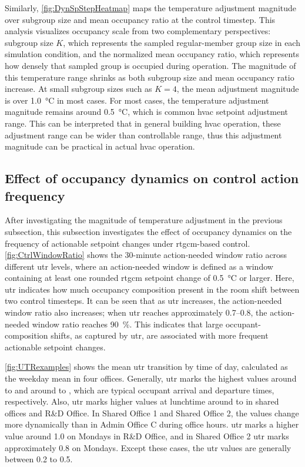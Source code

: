 Similarly, \autoref{fig:DynSpStepHeatmap} maps the temperature adjustment magnitude over subgroup size and mean occupancy ratio at the control timestep.
This analysis visualizes occupancy scale from two complementary perspectives: subgroup size $K$, which represents the sampled regular-member group size in each simulation condition, and the normalized mean occupancy ratio, which represents how densely that sampled group is occupied during operation.
The magnitude of this temperature range shrinks as both subgroup size and mean occupancy ratio increase.
At small subgroup sizes such as $K=4$, the mean adjustment magnitude is over \qty{1.0}{\celsius} in most cases.
For most cases, the temperature adjustment magnitude remains around \qty{0.5}{\celsius}, which is common \ac{hvac} setpoint adjustment range.
This can be interpreted that in general building \ac{hvac} operation, these adjustment range can be wider than controllable range, thus this adjustment magnitude can be practical in actual \ac{hvac} operation.

\subsection{Effect of occupancy dynamics on control action frequency}
After investigating the magnitude of temperature adjustment in the previous subsection, this subsection investigates the effect of occupancy dynamics on the frequency of actionable setpoint changes under \ac{rtgcm}-based control.
\autoref{fig:CtrlWindowRatio} shows the 30-minute action-needed window ratio across different \ac{utr} levels, where an action-needed window is defined as a window containing at least one rounded \ac{rtgcm} setpoint change of \qty{0.5}{\celsius} or larger.
Here, \ac{utr} indicates how much occupancy composition present in the room shift between two control timesteps.
It can be seen that as \ac{utr} increases, the action-needed window ratio also increases; when \ac{utr} reaches approximately 0.7--0.8, the action-needed window ratio reaches \qty{90}{\percent}.
This indicates that large occupant-composition shifts, as captured by \ac{utr}, are associated with more frequent actionable setpoint changes.

\autoref{fig:UTRexamples} shows the mean \ac{utr} transition by time of day, calculated as the weekday mean in four offices.
Generally, \ac{utr} marks the highest values around  to  and around  to , which are typical occupant arrival and departure times, respectively.
Also, \ac{utr} marks higher values at lunchtime around  to  in shared offices and R\&D Office.
In Shared Office 1 and Shared Office 2, the values change more dynamically than in Admin Office C during office hours.
\ac{utr} marks a higher value around 1.0 on Mondays in R\&D Office, and in Shared Office 2 \ac{utr} marks approximately 0.8 on Mondays.
Except these cases, the \ac{utr} values are generally between 0.2 to 0.5.

